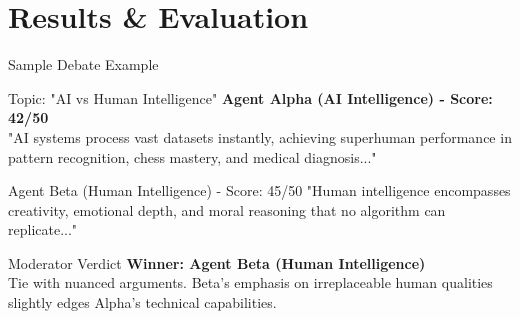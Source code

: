 \documentclass[aspectratio=169]{beamer}
\begin{document}
\section{Results \& Evaluation}
\begin{frame}{Sample Debate Example}
    \begin{block}{Topic: "AI vs Human Intelligence"}
        \small
        \textbf{Agent Alpha (AI Intelligence) - Score: 42/50}\\
        "AI systems process vast datasets instantly, achieving superhuman performance in pattern recognition, chess mastery, and medical diagnosis..."
    \end{block}
    
    \vspace{0.2cm}
    
    \begin{block}{Agent Beta (Human Intelligence) - Score: 45/50}
        \small
        "Human intelligence encompasses creativity, emotional depth, and moral reasoning that no algorithm can replicate..."
    \end{block}
    
    \vspace{0.2cm}
    
    \begin{alertblock}{Moderator Verdict}
        \small
        \textbf{Winner: Agent Beta (Human Intelligence)}\\
        Tie with nuanced arguments. Beta's emphasis on irreplaceable human qualities slightly edges Alpha's technical capabilities.
    \end{alertblock}
\end{frame}
\end{document}
